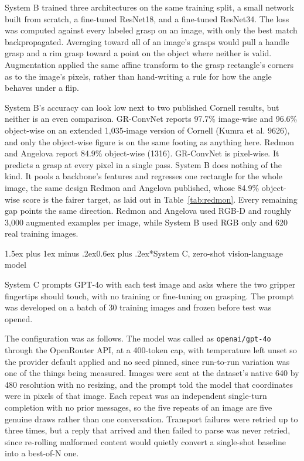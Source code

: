 \documentclass[12pt,letterpaper]{article}
\makeatletter
\renewcommand{\subsection}{\@startsection{subsection}{2}{0pt}%
  {1.5ex plus 1ex minus .2ex}{0.6ex plus .2ex}{\normalsize\itshape}}
\makeatother
\begin{document}
System B trained three architectures on the same training split, a
small network built from scratch, a fine-tuned ResNet18, and a
fine-tuned ResNet34. The loss was computed against every labeled grasp
on an image, with only the best match backpropagated. Averaging toward
all of an image's grasps would pull a handle grasp and a rim grasp
toward a point on the object where neither is valid. Augmentation
applied the same affine transform to the grasp rectangle's corners as
to the image's pixels, rather than hand-writing a rule for how the
angle behaves under a flip.

System B's accuracy can look low next to two published Cornell results,
but neither is an even comparison. GR-ConvNet reports 97.7\% image-wise
and 96.6\% object-wise on an extended 1,035-image version of Cornell
(Kumra et al. 9626), and only the object-wise figure is on the same
footing as anything here. Redmon and Angelova report 84.9\%
object-wise (1316). GR-ConvNet is pixel-wise. It predicts a grasp at
every pixel in a single pass. System B does nothing of the kind. It
pools a backbone's features and regresses one rectangle for the whole
image, the same design Redmon and Angelova published, whose 84.9\%
object-wise score is the fairer target, as laid out in
Table~\ref{tab:redmon}. Every remaining gap points the same direction.
Redmon and Angelova used RGB-D and roughly 3,000 augmented examples per
image, while System B used RGB only and 620 real training images.

\subsection*{System C, zero-shot vision-language model}

System C prompts GPT-4o with each test image and asks where the two
gripper fingertips should touch, with no training or fine-tuning on
grasping. The prompt was developed on a batch of 30 training images and
frozen before test was opened.

The configuration was as follows. The model was called as
\texttt{openai/gpt-4o} through the OpenRouter API, at a 400-token cap,
with temperature left unset so the provider default applied and no seed
pinned, since run-to-run variation was one of the things being
measured. Images were sent at the dataset's native 640 by 480
resolution with no resizing, and the prompt told the model that
coordinates were in pixels of that image. Each repeat was an
independent single-turn completion with no prior messages, so the five
repeats of an image are five genuine draws rather than one
conversation. Transport failures were retried up to three times, but a
reply that arrived and then failed to parse was never retried, since
re-rolling malformed content would quietly convert a single-shot
baseline into a best-of-N one.
\end{document}
